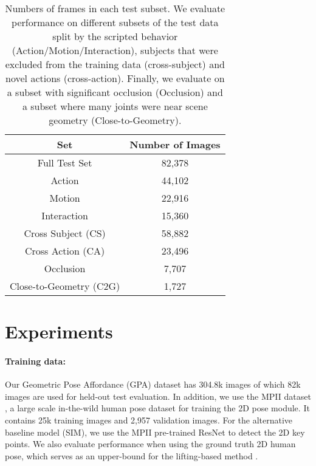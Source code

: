 \documentclass[times,referee,twocolumn,final,authoryear]{elsarticle}
\begin{document}
\begin{table}[t]
\begin{center}
\small
\begin{tabular}{c|c}
\hline
\textbf{Set} & \textbf{Number of Images} \\ 
\hline
Full Test Set & 82,378 \\
\hline\hline
Action & 44,102 \\
Motion & 22,916 \\
Interaction &  15,360 \\
\hline
\hline
Cross Subject (CS) & 58,882 \\
Cross Action (CA) & 23,496 \\
\hline
\hline
Occlusion & 7,707 \\
Close-to-Geometry (C2G) & 1,727  \\
\hline
\end{tabular}
\end{center}
\caption{Numbers of frames in each test subset. We evaluate performance on
different subsets of the test data split by the scripted behavior
(Action/Motion/Interaction), subjects that were excluded from the training data
(cross-subject) and novel actions (cross-action). Finally, we evaluate on a
subset with significant occlusion (Occlusion) and a subset where many joints
were near scene geometry (Close-to-Geometry).}
\label{table:testset}
\end{table}

\section{Experiments}



\paragraph{Training data:} Our Geometric Pose Affordance (GPA) dataset has 304.8k images
of which 82k images are used for held-out test evaluation.  In addition, we use the 
MPII dataset \citep{mpii}, a large scale in-the-wild human pose dataset for training the 
2D pose module. It contains 25k training images and 2,957 validation images.
For the alternative baseline model (SIM), we use the MPII pre-trained ResNet \cite{xiao2018simple} 
to detect the 2D key points. We also evaluate performance when using the ground truth 
2D human pose, which serves as an upper-bound for the lifting-based method \cite{simple}. 
\end{document}
